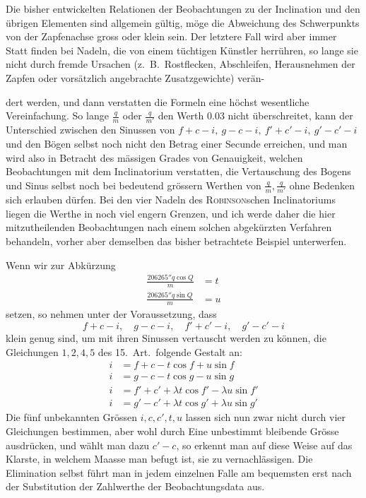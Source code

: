 Die bisher entwickelten Relationen der Beobachtungen zu der Inclination und den übrigen Elementen sind allgemein gültig, möge die Abweichung des Schwerpunkts von der Zapfenachse gross oder klein sein. Der letztere Fall wird aber immer Statt finden bei Nadeln, die von einem tüchtigen Künstler herrühren, so lange sie nicht durch fremde Ursachen (z.\ B.\ Rostflecken, Abschleifen, Herausnehmen der Zapfen oder vorsätzlich angebrachte Zusatzgewichte) verän-
\par\clearpage
{}
\noindent dert werden, und dann verstatten die Formeln eine höchst wesentliche Vereinfachung. So lange $\frac{q}{m}$ oder $\frac{q}{m'}$ den Werth $0.03$ nicht überschreitet, kann der Unterschied zwischen den Sinussen von $f+c-i,\ g-c-i,\ f'+c'-i,\ g'-c'-i$ und den Bögen selbst noch nicht den Betrag einer Secunde erreichen, und man wird also in Betracht des mässigen Grades von Genauigkeit, welchen Beobachtungen mit dem Inclinatorium verstatten, die Vertauschung des Bogens und Sinus selbst noch bei bedeutend grössern Werthen von $\frac{q}{m},\frac{q}{m'}$ ohne Bedenken sich erlauben dürfen. Bei den vier Nadeln des \textsc{Robinson}schen Inclinatoriums liegen die Werthe in noch viel engern Grenzen, und ich werde daher die hier mitzutheilenden Beobachtungen nach einem solchen abgekürzten Verfahren behandeln, vorher aber demselben das bisher betrachtete Beispiel unterwerfen.

Wenn wir zur Abkürzung
\[
\begin{aligned}
\frac{206265''q\cos Q}{m}&=t\\
\frac{206265''q\sin Q}{m}&=u
\end{aligned}
\]
setzen, so nehmen unter der Voraussetzung, dass
\[
f+c-i,\quad g-c-i,\quad f'+c'-i,\quad g'-c'-i
\]
klein genug sind, um mit ihren Sinussen vertauscht werden zu können, die Gleichungen $1,2,4,5$ des 15.\ Art.\ folgende Gestalt an:
\[
\begin{aligned}
i&=f+c-t\cos f+u\sin f\\
i&=g-c-t\cos g-u\sin g\\
i&=f'+c'+\lambda t\cos f'-\lambda u\sin f'\\
i&=g'-c'+\lambda t\cos g'+\lambda u\sin g'
\end{aligned}
\]
Die fünf unbekannten Grössen $i,c,c',t,u$ lassen sich nun zwar nicht durch vier Gleichungen bestimmen, aber wohl durch Eine unbestimmt bleibende Grösse ausdrücken, und wählt man dazu $c'-c$, so erkennt man auf diese Weise auf das Klarste, in welchem Maasse man befugt ist, sie zu vernachlässigen. Die Elimination selbst führt man in jedem einzelnen Falle am bequemsten erst nach der Substitution der Zahlwerthe der Beobachtungsdata aus.

